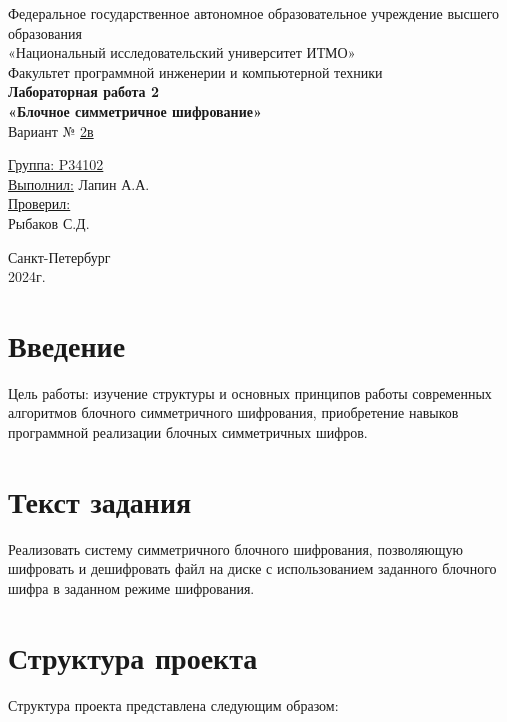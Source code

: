 \documentclass[a4paper, 14pt]{report}
\begin{document}
\begin{titlepage}
    \centering
    {\large Федеральное государственное автономное образовательное учреждение высшего образования}\\
    {\large «Национальный исследовательский университет ИТМО»}\\[0.5cm]

    {\large Факультет программной инженерии и компьютерной техники}\\[3cm]

    {\large \bfseries Лабораторная работа 2}\\[0.5cm]
    {\large \bfseries «Блочное симметричное шифрование»}\\[1cm]

    {\large Вариант № \underline{2в}}\\[5cm]
    \begin{flushright}
        {\large \underline{Группа: P34102}}\\[0.5cm]
        {\large \underline{Выполнил:} Лапин А.А.}\\[1cm]

        {\large \underline{Проверил:}}\\
        {\large Рыбаков С.Д.}\\[9cm]
    \end{flushright}

    {\large Санкт-Петербург}\\
    {\large 2024г.}
\end{titlepage}

\setcounter{page}{2}
\tableofcontents
\newpage

\chapter*{Введение}
Цель работы: изучение структуры и основных принципов работы современных алгоритмов блочного симметричного шифрования, приобретение навыков программной реализации блочных симметричных шифров.
\chapter{Текст задания}
Реализовать систему симметричного блочного шифрования, позволяющую шифровать и дешифровать файл на диске с использованием заданного блочного шифра в заданном режиме шифрования.

\chapter{Структура проекта}
Структура проекта представлена следующим образом:
\end{document}
